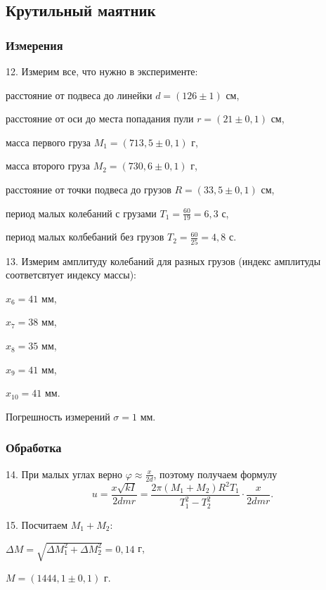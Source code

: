 \subsection{Крутильный маятник}

\subsubsection{Измерения}

12. Измерим все, что нужно в эксперименте:

расстояние от подвеса до линейки $d = (126 \pm 1)$ см,

расстояние от оси до места попадания пули $r = (21 \pm 0,1)$ см,

масса первого груза $M_1 = (713,5 \pm 0,1)$ г,

масса второго груза $M_2 = (730,6 \pm 0,1)$ г,

расстояние от точки подвеса до грузов $R = (33,5 \pm 0,1)$ см,

период малых колебаний с грузами $T_1 =\frac{60}{19} = 6,3$ с,

период малых колбебаний без грузов $T_2 = \frac{60}{25} = 4,8$ с.

13. Измерим амплитуду колебаний для разных грузов (индекс амплитуды
соответсвтует индексу массы):
\begin{center}

$x_6 = 41$ мм,

$x_7 = 38$ мм,

$x_8 = 35$ мм,

$x_9 = 41$ мм,

$x_{10} = 41$ мм.

\end{center}

Погрешность измерений $\sigma = 1$ мм.

\subsubsection{Обработка}
14. При малых углах верно $\varphi \approx \frac{x}{2d}$,
поэтому получаем формулу
\[u = \frac{x\sqrt{kI}}{2dmr} = \frac{2\pi\left(M_1+M_2\right)R^2T_1}{T_{1}^2 - T^{2}_2}\cdot\frac{x}{2dmr}.\]

15. Посчитаем $M_1+M_2$:
\begin{center}
$\Delta M = \sqrt{\Delta M_1^2 +\Delta M_2^2} = 0,14$ г,

$M = (1444,1 \pm 0,1)$ г.
\end{center}

